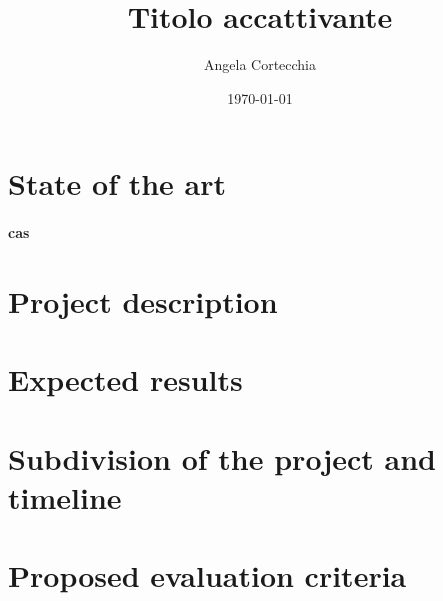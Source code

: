 \documentclass[12pt]{article}
\begin{document}
\title{Titolo accattivante}
\author{Angela Cortecchia}
\date{\today}
\maketitle

\setlength{\parindent}{0em}
\setlength{\parskip}{1em}

\section{State of the art}\label{sec:state-of-the-art}

\paragraph{\ac{cas}}

\section{Project description}\label{sec:project-description}


\section{Expected results}\label{sec:expected-results}


\section{Subdivision of the project and timeline}\label{sec:subdivision-of-the-project-and-timeline}


\section{Proposed evaluation criteria}\label{sec:proposed-evaluation-criteria}




\end{document}
